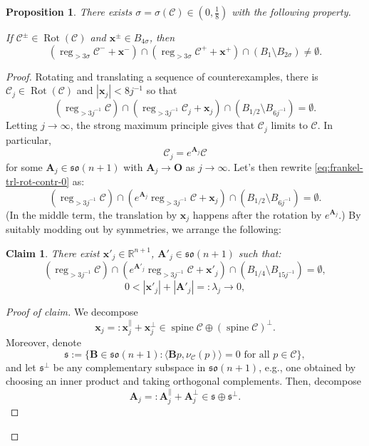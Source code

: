 \documentclass[11pt, letterpaper, reqno]{amsart}
\numberwithin{equation}{section}
\newtheorem{Prop}[Def]{Proposition}
\newtheorem{Cla}[Def]{Claim}
\theoremstyle{remark}
\newcommand{\RR}{\mathbb{R}}
\newcommand{\cC}{\mathcal{C}}
\newcommand{\mbfA}{\mathbf{A}}
\newcommand{\mbfB}{\mathbf{B}}
\newcommand{\mbfO}{\mathbf{O}}
\newcommand{\mbfx}{\mathbf{x}}
\newcommand{\reg}{\operatorname{reg}}
\newcommand{\spine}{\operatorname{spine}}
\newcommand{\Rot}{\operatorname{Rot}}
\begin{document}
\begin{Prop}\label{Prop:frank-transl-rot}
There exists $\sigma=\sigma(\cC) \in (0,\tfrac 1 8)$ with the following property.

If $\cC^\pm \in \Rot(\cC)$ and $\mbfx^\pm \in B_{4\sigma}$, then 
\[
(\reg_{>3\sigma}\cC^- +\mbfx^-) \cap (\reg_{>3\sigma}\cC^+ + \mbfx^+) \cap (B_1 \setminus B_{2\sigma}) \not = \emptyset. 
\]
\end{Prop}
\begin{proof}
Rotating and translating a sequence of counterexamples, there is $\cC_j \in \Rot(\cC)$ and $|\mbfx_j| < 8j^{-1}$ so that 
\begin{equation} \label{eq:frankel-trl-rot-contr-0}
(\reg_{>3j^{-1}} \cC) \cap (\reg_{>3j^{-1}} \cC_j + \mbfx_j) \cap (B_{1/2} \setminus B_{6j^{-1}}) = \emptyset. 
\end{equation}
Letting $j\to\infty$, the strong maximum principle gives that $\cC_j$ limits to $\cC$. In particular,
\[ \cC_j = e^{\mbfA_j} \cC \]
for some $\mbfA_j \in \mathfrak{so}(n+1)$ with $\mbfA_j \to \mbfO$ as $j \to \infty$. Let's then rewrite \eqref{eq:frankel-trl-rot-contr-0} as:
\begin{equation} \label{eq:frankel-trl-rot-contr}
(\reg_{>3j^{-1}} \cC) \cap (e^{\mbfA_j} \reg_{>3j^{-1}} \cC + \mbfx_j) \cap (B_{1/2} \setminus B_{6j^{-1}}) = \emptyset. 
\end{equation}
(In the middle term, the translation by $\mbfx_j$ happens after the rotation by $e^{\mbfA_j}$.) By suitably modding out by symmetries, we arrange the following:

\begin{Cla} \label{clai:frankel-trl-rot}
    There exist $\mbfx'_j \in \RR^{n+1}$, $\mbfA'_j \in \mathfrak{so}(n+1)$ such that:
    \begin{equation} \label{eq:frankel-trl-rot-yj-Bj}
	(\reg_{>3j^{-1}}\cC) \cap (e^{\mbfA'_j} \reg_{>3j^{-1}} \cC + \mbfx'_j) \cap (B_{1/4} \setminus B_{15j^{-1}}) = \emptyset,
    \end{equation}
    \begin{equation} \label{eq:frankel-trl-rot-lambda}
	0 < |\mbfx'_j| + |\mbfA'_j| =: \lambda_j \to 0,
    \end{equation}
\end{Cla}
\begin{proof}[Proof of claim]
    We decompose
\[ \mbfx_j =: \mbfx_j^\parallel + \mbfx_j^\perp \in \spine \cC \oplus (\spine \cC)^\perp. \]
Moreover, denote
\[ \mathfrak{s} := \{ \mbfB \in \mathfrak{so}(n+1) : \langle \mbfB p, \nu_\cC(p) \rangle = 0 \text{ for all } p \in \cC \}, \]
and let $\mathfrak{s}^\perp$ be any complementary subspace in $\mathfrak{so}(n+1)$, e.g., one obtained by choosing an inner product and taking orthogonal complements. Then, decompose
\[ \mbfA_j =: \mbfA_j^\parallel + \mbfA_j^\perp \in \mathfrak{s} \oplus \mathfrak{s}^\perp. \]


\end{proof}
\end{proof}
\end{document}
